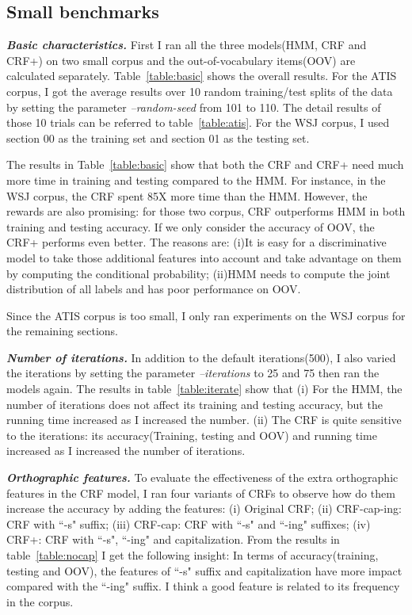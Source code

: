 \documentclass[10pt]{article}
\begin{document}
\subsection{Small benchmarks}
{\bf \emph{Basic characteristics.}} First I ran all the three models(HMM, CRF and CRF+) on two small corpus and the out-of-vocabulary items(OOV) are calculated separately. Table~\ref{table:basic} shows the overall results. For the ATIS corpus, I got the average results over 10 random training/test splits of the data by setting the parameter \emph{--random-seed} from 101 to 110. The detail results of those 10 trials can be referred to table~\ref{table:atis}.  For the WSJ corpus, I used section 00 as the training set and section 01 as the testing set.

The results in Table~\ref{table:basic} show that both the CRF and CRF+ need much more time in training and testing compared to the HMM. For instance, in the WSJ corpus, the CRF spent 85X more time than the HMM. However, the rewards are also promising: for those two corpus, CRF outperforms HMM in both training and testing accuracy. If we only consider the accuracy of OOV, the CRF+ performs even better. The reasons are: (i)It is easy for a discriminative model to take those additional features into account and take advantage on them by computing the conditional probability; (ii)HMM needs to compute the joint distribution of all labels and has poor performance on OOV.

 Since the ATIS corpus is too small, I only ran experiments on the WSJ corpus for the remaining sections.  
 
{\bf \emph{Number of iterations.}} In addition to the default iterations(500), I also varied the iterations by setting the parameter \emph{--iterations} to 25 and 75 then ran the models again. The results in table~\ref{table:iterate} show that (i) For the HMM, the number of iterations does not affect its training and testing accuracy, but the running time increased as I increased the number. (ii) The CRF is quite sensitive to the iterations: its accuracy(Training, testing and OOV) and running time increased as I increased the number of iterations. 

{\bf \emph{Orthographic features.}} To evaluate the effectiveness of the extra orthographic features in the CRF model, I ran four variants of CRFs to observe how do them increase the accuracy by adding the features: (i) Original CRF; (ii) CRF-cap-ing: CRF with ``-s" suffix; (iii) CRF-cap: CRF with ``-s" and ``-ing" suffixes; (iv) CRF+: CRF with ``-s", ``-ing" and capitalization. From the results in table~\ref{table:nocap} I get the following insight: In terms of accuracy(training, testing and OOV), the features of ``-s" suffix and capitalization have more impact compared with the ``-ing" suffix. I think a good feature is related to its frequency in the corpus.
\end{document}
